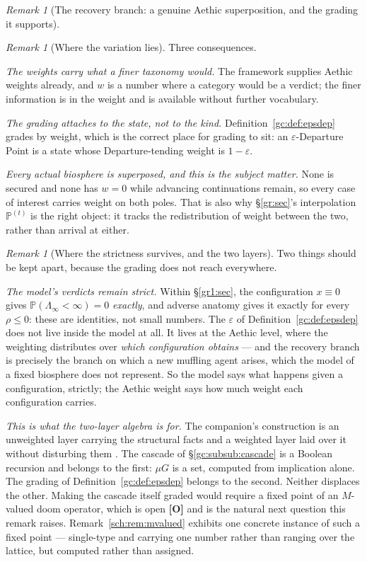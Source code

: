 \documentclass[11pt]{article}
\numberwithin{equation}{section}
\theoremstyle{plain}
\theoremstyle{definition}
\theoremstyle{remark}
\newtheorem{remark}[theorem]{Remark}
\newcommand{\PP}{\mathbb{P}}
\begin{document}
\begin{remark}[The recovery branch: a genuine Aethic superposition,
and the grading it supports]
\begin{remark}[Where the variation lies]
Three consequences.

\emph{The weights carry what a finer taxonomy would.} The framework
supplies Aethic weights already, and $w$ is a number where a category
would be a verdict; the finer information is in the weight and is
available without further vocabulary.

\emph{The grading attaches to the state, not to the kind.}
Definition~\ref{gc:def:epsdep} grades by weight, which is the correct
place for grading to sit: an $\varepsilon$-Departure Point is a state
whose Departure-tending weight is $1-\varepsilon$.

\emph{Every actual biosphere is superposed, and this is the subject
matter.} None is secured and none has $w=0$ while advancing
continuations remain, so every case of interest carries weight on both
poles. That is also why \S\ref{gr:sec}'s interpolation $\PP^{(t)}$ is
the right object: it tracks the redistribution of weight between the
two, rather than arrival at either.
\end{remark}

\begin{remark}[Where the strictness survives, and the two layers]
\label{gc:rem:twolayers}
Two things should be kept apart, because the grading does not reach
everywhere.

\emph{The model's verdicts remain strict.} Within \S\ref{gr1:sec}, the
configuration $x\equiv0$ gives $\PP(\Lambda_\infty<\infty)=0$
\emph{exactly}, and adverse anatomy gives it exactly for every
$\rho\le0$: these are identities, not small numbers. The $\varepsilon$
of Definition~\ref{gc:def:epsdep} does not live inside the model at
all. It lives at the Aethic level, where the weighting distributes over
\emph{which configuration obtains} --- and the recovery branch is
precisely the branch on which a new muffling agent arises, which the
model of a fixed biosphere does not represent. So the model says what
happens given a configuration, strictly; the Aethic weight says how
much weight each configuration carries.

\emph{This is what the two-layer algebra is for.} The companion's
construction is an unweighted layer carrying the structural facts and a
weighted layer laid over it without disturbing them
\cite{WeightAlg}. The cascade of \S\ref{gc:subsub:cascade} is a Boolean
recursion and belongs to the first: $\mu G$ is a set, computed from
implication alone. The grading of
Definition~\ref{gc:def:epsdep} belongs to the second. Neither
displaces the other. Making the cascade itself graded would require a
fixed point of an $M$-valued doom operator, which is open \textbf{[O]}
and is the natural next question this remark raises.
Remark~\ref{sch:rem:mvalued} exhibits one concrete instance of such a
fixed point --- single-type and carrying one number rather than ranging
over the lattice, but computed rather than assigned.
\end{remark}
\end{remark}
\end{document}
